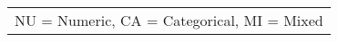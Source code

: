 \begin{table}[]
{\begin{tabular}{ccccccc}
\multicolumn{7}{c}{NU = Numeric, CA = Categorical, MI = Mixed}                                                                                                                                                                                                                                                                                                                                                                                                                                                                                     
\end{tabular}
\label{tab:userstudydatasets}
}
\vspace{-0.3cm}
\end{table}
